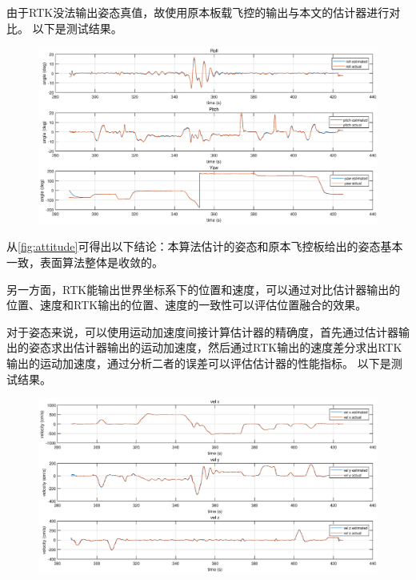 \documentclass[
  type=master
]{gdutthesis}
\begin{document}
由于RTK没法输出姿态真值，故使用原本板载飞控的输出与本文的估计器进行对比。
以下是测试结果。
\begin{figure}[htbp]
	\centering
	\includegraphics[width=1.0\textwidth]{attitude1.eps}
	\label{fig:attitude}
\end{figure} 

从\autoref{fig:attitude}可得出以下结论：本算法估计的姿态和原本飞控板给出的姿态基本一致，表面算法整体是收敛的。

另一方面，RTK能输出世界坐标系下的位置和速度，可以通过对比估计器输出的位置、速度和RTK输出的位置、速度的一致性可以评估位置融合的效果。

对于姿态来说，可以使用运动加速度间接计算估计器的精确度，首先通过估计器输出的姿态求出估计器输出的运动加速度，然后通过RTK输出的速度差分求出RTK输出的运动加速度，通过分析二者的误差可以评估估计器的性能指标。
以下是测试结果。

\begin{figure}[H]
	\centering
	\includegraphics[width=1.0\textwidth]{velocity.eps}
	\label{fig:velocity}
\end{figure}
\end{document}
